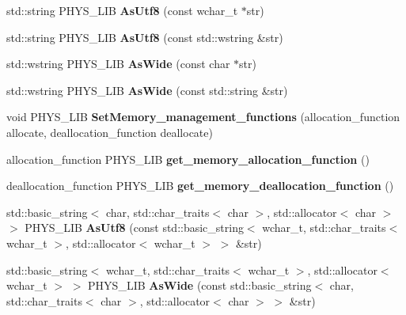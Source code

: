 \begin{DoxyCompactItemize}
\item 
\hypertarget{namespacephys_1_1xml_a3adcb83b952ab6a714da13d20ab189d7}{
std::string PHYS\_\-LIB {\bfseries AsUtf8} (const wchar\_\-t $\ast$str)}
\label{d9/d27/namespacephys_1_1xml_a3adcb83b952ab6a714da13d20ab189d7}

\item 
\hypertarget{namespacephys_1_1xml_aed8d86b7ea1735f88de53d7947740ddd}{
std::string PHYS\_\-LIB {\bfseries AsUtf8} (const std::wstring \&str)}
\label{d9/d27/namespacephys_1_1xml_aed8d86b7ea1735f88de53d7947740ddd}

\item 
\hypertarget{namespacephys_1_1xml_ac14c911adabeb58e973c36105b85abac}{
std::wstring PHYS\_\-LIB {\bfseries AsWide} (const char $\ast$str)}
\label{d9/d27/namespacephys_1_1xml_ac14c911adabeb58e973c36105b85abac}

\item 
\hypertarget{namespacephys_1_1xml_acf80dd12469021a66d48a325484ba9f1}{
std::wstring PHYS\_\-LIB {\bfseries AsWide} (const std::string \&str)}
\label{d9/d27/namespacephys_1_1xml_acf80dd12469021a66d48a325484ba9f1}

\item 
\hypertarget{namespacephys_1_1xml_af067dbcf4b0c314947f5f51e15df98dc}{
void PHYS\_\-LIB {\bfseries SetMemory\_\-management\_\-functions} (allocation\_\-function allocate, deallocation\_\-function deallocate)}
\label{d9/d27/namespacephys_1_1xml_af067dbcf4b0c314947f5f51e15df98dc}

\item 
\hypertarget{namespacephys_1_1xml_ab410aa42cb0ed412ad7b6f573ae21cf4}{
allocation\_\-function PHYS\_\-LIB {\bfseries get\_\-memory\_\-allocation\_\-function} ()}
\label{d9/d27/namespacephys_1_1xml_ab410aa42cb0ed412ad7b6f573ae21cf4}

\item 
\hypertarget{namespacephys_1_1xml_a00bf38e865e9cd95e3624b3b8b9d7bc9}{
deallocation\_\-function PHYS\_\-LIB {\bfseries get\_\-memory\_\-deallocation\_\-function} ()}
\label{d9/d27/namespacephys_1_1xml_a00bf38e865e9cd95e3624b3b8b9d7bc9}

\item 
\hypertarget{namespacephys_1_1xml_a8721da4a57634acd3a3eb754d898fb88}{
std::basic\_\-string$<$ char, std::char\_\-traits$<$ char $>$, std::allocator$<$ char $>$ $>$ PHYS\_\-LIB {\bfseries AsUtf8} (const std::basic\_\-string$<$ wchar\_\-t, std::char\_\-traits$<$ wchar\_\-t $>$, std::allocator$<$ wchar\_\-t $>$ $>$ \&str)}
\label{d9/d27/namespacephys_1_1xml_a8721da4a57634acd3a3eb754d898fb88}

\item 
\hypertarget{namespacephys_1_1xml_ad365a4575e9bdc674e7512a573f05c08}{
std::basic\_\-string$<$ wchar\_\-t, std::char\_\-traits$<$ wchar\_\-t $>$, std::allocator$<$ wchar\_\-t $>$ $>$ PHYS\_\-LIB {\bfseries AsWide} (const std::basic\_\-string$<$ char, std::char\_\-traits$<$ char $>$, std::allocator$<$ char $>$ $>$ \&str)}
\label{d9/d27/namespacephys_1_1xml_ad365a4575e9bdc674e7512a573f05c08}

\end{DoxyCompactItemize}
